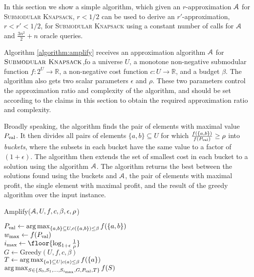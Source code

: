 \documentclass[a4paper,UKenglish,cleveref, autoref]{lipics-v2019}
\newcommand{\SK}{{\textsc{Submodular Knapsack}}\xspace}
\begin{document}
In this section we show a simple algorithm, which given
an $r$-approximation $\mathcal{A}$ for \SK, $r<1/2$ can
be used to derive an $r'$-approximation, $r<r' <1/2$, for
\SK using  a constant number of calls
for $\mathcal{A}$ and $\frac{3n^2}{2}+n$ oracle queries.

Algorithm \ref{algorithm:amplify} receives
an approximation algorithm $\mathcal{A}$ for $\SK$,ƒo
a universe $U$, a monotone non-negative
submodular function $f:2^U \rightarrow \mathbb{R}$,
a non-negative cost function $c:U \rightarrow \mathbb{R}$, and a budget $\beta$.
The algorithm also gets two scalar parameters $\epsilon$
and $\rho$.  These two parameters control the approximation
ratio and complexity of the algorithm, and should be set according
to the claims in this section to obtain the required approximation
ratio and complexity.

Broadly speaking,  the algorithm finds the pair of  elements with maximal value $P_{\text{val}}$. It then divides all pairs of elements $\{a,b\} \subseteq U$ for which
$\frac{f(\{a,b\})}{f(P_{\text{val}})} \geq \rho$ into {\em buckets}, where the subsets
in each bucket have the same value to a factor of $(1+\epsilon)$.
The algorithm then extends the set of smallest cost in  each bucket
to a solution using the algorithm $\mathcal{A}$.  The algorithm returns the
best between the solutions found using the buckets and $\mathcal{A}$, the pair of
elements with maximal profit, the single element with maximal profit, and the result of the greedy algorithm
over the input instance.

\begin{algorithm}
	\caption{Amplify($\mathcal{A}, U, f, c, \beta, \epsilon, \rho$)}
	\label{algorithm:amplify}
	$P_{\text{val}} \leftarrow \operatorname*{arg\,max}_{ \{a,b\} \subseteq U, c(\{a,b\})\leq \beta } f(\{a,b\})$
	\\ $w_{\max}\leftarrow f(P_{\text{val}})$
	\\ $i_{\max} \leftarrow \floor{\log_{1 + \epsilon} \frac{1}{\rho}}$
	\\
	$G \leftarrow \text{Greedy}(U, f, c, \beta)$ \label{amplify:greedy}
	\\
	$T \leftarrow \operatorname*{arg\,max}_{\{a\}\subseteq U| c(a)\leq \beta} f(\{a\})$ \label{amplify:singletons}
	\\
	\Return $\operatorname*{arg\,max}_{S \in \{S_0, S_1, \ldots, S_{i_{\max}}, G, P_{\text{val}},T\}} f(S)$

\end{algorithm}
\end{document}
